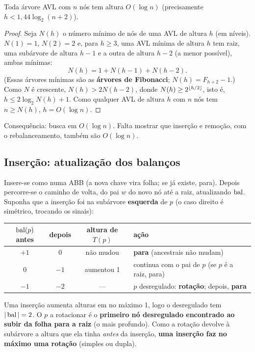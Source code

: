 \begin{teo}\label{teo:avlaltura}
Toda árvore AVL com $n$ nós tem altura $O(\log n)$ (precisamente $h<1{,}44\log_2(n+2)$).
\end{teo}
\begin{proof}
Seja $N(h)$ o número mínimo de nós de uma AVL de altura $h$ (em níveis). $N(1)=1$, $N(2)=2$ e, para $h\ge3$, uma AVL mínima de altura $h$ tem raiz, uma subárvore de altura $h-1$ e a outra de altura $h-2$ (a menor possível), ambas mínimas:
\[
N(h)=1+N(h-1)+N(h-2).
\]
(Essas árvores mínimas são as \textbf{árvores de Fibonacci}; $N(h)=F_{h+2}-1$.) Como $N$ é crescente, $N(h)>2N(h-2)$, donde $N(h)\ge2^{\lfloor h/2\rfloor}$, isto é, $h\le2\log_2N(h)+1$. Como qualquer AVL de altura $h$ com $n$ nós tem $n\ge N(h)$, $h=O(\log n)$.
\end{proof}
Consequência: busca em $O(\log n)$. Falta mostrar que inserção e remoção, com o rebalanceamento, também são $O(\log n)$.

\subsection{Inserção: atualização dos balanços}
Insere-se como numa ABB (a nova chave vira folha; se já existe, para). Depois percorre-se o caminho de volta, do pai $w$ do novo nó até a raiz, atualizando $\operatorname{bal}$. Suponha que a inserção foi na subárvore \textbf{esquerda} de $p$ (o caso direito é simétrico, trocando os sinais):
\begin{center}
\small
\begin{tabular}{@{}cccl@{}}
\toprule
$\operatorname{bal}(p)$ antes & depois & altura de $T(p)$ & ação\\
\midrule
$+1$ & $0$ & não mudou & \textbf{para} (ancestrais não mudam)\\
$0$ & $-1$ & aumentou 1 & continua com o pai de $p$ (se $p$ é a raiz, para)\\
$-1$ & $-2$ & --- & $p$ desregulado: \textbf{rotação}; depois, \textbf{para}\\
\bottomrule
\end{tabular}
\end{center}
Uma inserção aumenta alturas em no máximo 1, logo o desregulado tem $|\operatorname{bal}|=2$. O $p$ a rotacionar é o \textbf{primeiro nó desregulado encontrado ao subir da folha para a raiz} (o mais profundo). Como a rotação devolve à subárvore a altura que ela tinha \emph{antes} da inserção, \textbf{uma inserção faz no máximo uma rotação} (simples ou dupla).

